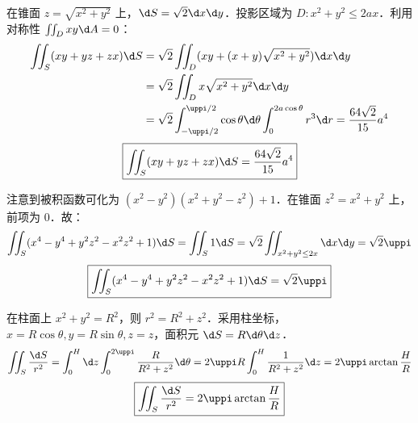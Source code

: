 \begin{solution}

    在锥面 $z=\sqrt{x^2+y^2}$ 上，$\d S = \sqrt{2} \d x \d y$．投影区域为 $D: x^2+y^2 \le 2ax$．利用对称性 $\iint_D xy \d A = 0$：
    \begin{equation}
        \begin{aligned}
            \iint_{S} (xy+yz+zx) \d S & = \sqrt{2} \iint_{D} (xy + (x+y)\sqrt{x^2+y^2}) \d x \d y                                                                \\
                                      & = \sqrt{2} \iint_{D} x\sqrt{x^2+y^2} \d x \d y                                                                           \\
                                      & = \sqrt{2} \int_{-\uppi/2}^{\uppi/2} \cos \theta \d \theta \int_{0}^{2a\cos \theta} r^3 \d r = \frac{64\sqrt{2}}{15} a^4
        \end{aligned}
    \end{equation}
    \begin{equation}
        \boxed{\iint_{S} (xy+yz+zx) \d S = \frac{64\sqrt{2}}{15} a^4}
    \end{equation}


    注意到被积函数可化为 $(x^2-y^2)(x^2+y^2-z^2) + 1$．在锥面 $z^2 = x^2+y^2$ 上，前项为 $0$．故：
    \begin{equation}
        \iint_{S} (x^4-y^4+y^2z^2-x^2z^2+1) \d S = \iint_{S} 1 \d S = \sqrt{2} \iint_{x^2+y^2 \le 2x} \d x \d y = \sqrt{2} \uppi
    \end{equation}
    \begin{equation}
        \boxed{\iint_{S} (x^4-y^4+y^2z^2-x^2z^2+1) \d S = \sqrt{2}\uppi}
    \end{equation}


    在柱面上 $x^2+y^2=R^2$，则 $r^2 = R^2+z^2$．采用柱坐标，$x=R\cos\theta, y=R\sin\theta, z=z$，面积元 $\d S = R \d \theta \d z$．
    \begin{equation}
        \iint_{S} \frac{\d S}{r^2} = \int_{0}^{H} \d z \int_{0}^{2\uppi} \frac{R}{R^2+z^2} \d \theta = 2\uppi R \int_{0}^{H} \frac{1}{R^2+z^2} \d z = 2\uppi \arctan \frac{H}{R}
    \end{equation}
    \begin{equation}
        \boxed{\iint_{S} \frac{\d S}{r^2} = 2\uppi \arctan \frac{H}{R}}
    \end{equation}



\end{solution}
